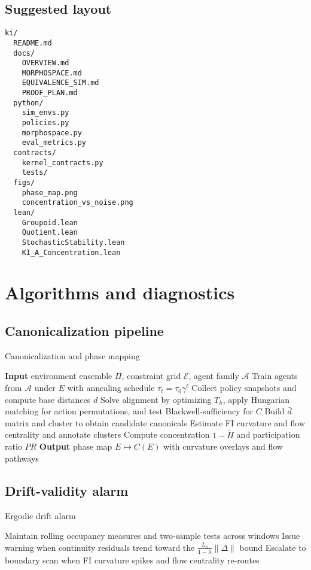 \documentclass[11pt]{article}
\newcommand{\1}{\mathbbm{1}}
\begin{document}
\subsection{Suggested layout}
\begin{verbatim}
ki/
  README.md
  docs/
    OVERVIEW.md
    MORPHOSPACE.md
    EQUIVALENCE_SIM.md
    PROOF_PLAN.md
  python/
    sim_envs.py
    policies.py
    morphospace.py
    eval_metrics.py
  contracts/
    kernel_contracts.py
    tests/
  figs/
    phase_map.png
    concentration_vs_noise.png
  lean/
    Groupoid.lean
    Quotient.lean
    StochasticStability.lean
    KI_A_Concentration.lean
\end{verbatim}

\section{Algorithms and diagnostics}
\subsection{Canonicalization pipeline}
\begin{algorithm}[H]
\caption{Canonicalization and phase mapping}
\begin{algorithmic}[1]
\STATE \textbf{Input} environment ensemble $\Pi$, constraint grid $\mathcal{E}$, agent family $\mathcal{A}$
    \STATE Train agents from $\mathcal{A}$ under $E$ with annealing schedule $\tau_t = \tau_0 \gamma^t$
    \STATE Collect policy snapshots and compute base distances $d$
    \STATE Solve alignment by optimizing $T_h$, apply Hungarian matching for action permutations, and test Blackwell-sufficiency for $C$ \parencite{Blackwell1953}
    \STATE Build $\bar d$ matrix and cluster to obtain candidate canonicals
    \STATE Estimate FI curvature and flow centrality and annotate clusters \parencite{CoverThomas2006}
    \STATE Compute concentration $1 - \tilde H$ and participation ratio $PR$
\ENDFOR
\STATE \textbf{Output} phase map $E \mapsto C(E)$ with curvature overlays and flow pathways
\end{algorithmic}
\end{algorithm}

\subsection{Drift-validity alarm}
\begin{algorithm}[H]
\caption{Ergodic drift alarm}
\begin{algorithmic}[1]
\STATE Maintain rolling occupancy measures and two-sample tests across windows
\STATE Issue warning when continuity residuals trend toward the $\frac{L_0}{1-\lambda}\|\Delta\|$ bound \parencite{Villani2009}
\STATE Escalate to boundary scan when FI curvature spikes and flow centrality re-routes \parencite{CoverThomas2006}
\end{algorithmic}
\end{algorithm}
\end{document}

